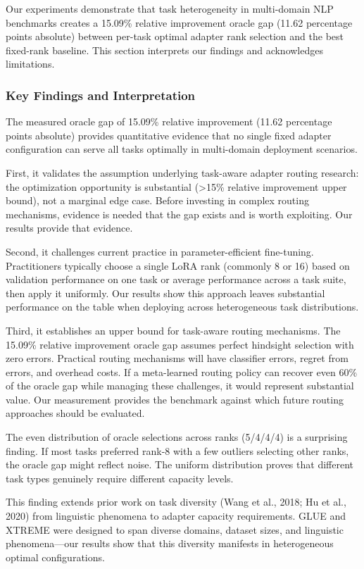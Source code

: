 
Our experiments demonstrate that task heterogeneity in multi-domain NLP benchmarks creates a 15.09\% relative improvement oracle gap (11.62 percentage points absolute) between per-task optimal adapter rank selection and the best fixed-rank baseline. This section interprets our findings and acknowledges limitations.

\subsubsection{Key Findings and Interpretation}

The measured oracle gap of 15.09\% relative improvement (11.62 percentage points absolute) provides quantitative evidence that no single fixed adapter configuration can serve all tasks optimally in multi-domain deployment scenarios.

First, it validates the assumption underlying task-aware adapter routing research: the optimization opportunity is substantial (>15\% relative improvement upper bound), not a marginal edge case. Before investing in complex routing mechanisms, evidence is needed that the gap exists and is worth exploiting. Our results provide that evidence.

Second, it challenges current practice in parameter-efficient fine-tuning. Practitioners typically choose a single LoRA rank (commonly 8 or 16) based on validation performance on one task or average performance across a task suite, then apply it uniformly. Our results show this approach leaves substantial performance on the table when deploying across heterogeneous task distributions.

Third, it establishes an upper bound for task-aware routing mechanisms. The 15.09\% relative improvement oracle gap assumes perfect hindsight selection with zero errors. Practical routing mechanisms will have classifier errors, regret from errors, and overhead costs. If a meta-learned routing policy can recover even 60\% of the oracle gap while managing these challenges, it would represent substantial value. Our measurement provides the benchmark against which future routing approaches should be evaluated.

The even distribution of oracle selections across ranks (5/4/4/4) is a surprising finding. If most tasks preferred rank-8 with a few outliers selecting other ranks, the oracle gap might reflect noise. The uniform distribution proves that different task types genuinely require different capacity levels.

This finding extends prior work on task diversity (Wang et al., 2018; Hu et al., 2020) from linguistic phenomena to adapter capacity requirements. GLUE and XTREME were designed to span diverse domains, dataset sizes, and linguistic phenomena—our results show that this diversity manifests in heterogeneous optimal configurations.

